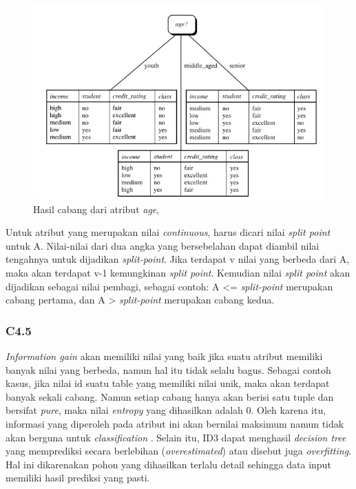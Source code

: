 \begin{figure}
\includegraphics[scale=1]{Gambar/hasilcabangid3.jpg}
\caption[Hasil pohon faktor pada atribut \textsl{age} dari table 2.1]{Hasil cabang dari atribut \textsl{age}, \cite{DM}} 
\label{fig:hasilCabang}
\end{figure}

Untuk atribut yang merupakan nilai \textsl{continuous}, harus dicari nilai \textsl{split point} untuk A. Nilai-nilai dari dua angka yang bersebelahan dapat diambil nilai tengahnya untuk dijadikan \textsl{split-point}. Jika terdapat v nilai yang berbeda dari A, maka akan terdapat v-1 kemungkinan \textsl{split point}. Kemudian nilai \textsl{split point} akan dijadikan sebagai nilai pembagi, sebagai contoh: A <= \textsl{split-point} merupakan cabang pertama, dan A > \textsl{split-point} merupakan cabang kedua.

\subsubsection{C4.5}

\textsl{Information gain} akan memiliki nilai yang baik jika suatu atribut memiliki banyak nilai yang berbeda, namun hal itu tidak selalu bagus. Sebagai contoh kasus, jika nilai id suatu table yang memiliki nilai unik, maka akan terdapat banyak sekali cabang. Namun setiap cabang hanya akan berisi satu tuple dan bersifat \textsl{pure}, maka nilai \textsl{entropy} yang dihasilkan adalah 0. Oleh karena itu, informasi yang diperoleh pada atribut ini akan bernilai maksimum namun tidak akan berguna untuk \textsl{classification} \cite{DM}. Selain itu, ID3 dapat menghasil \textsl{decision tree} yang memprediksi secara berlebihan (\textsl{overestimated}) atau disebut juga \textsl{overfitting}. Hal ini dikarenakan pohon yang dihasilkan terlalu detail sehingga data input memiliki hasil prediksi yang pasti. 

